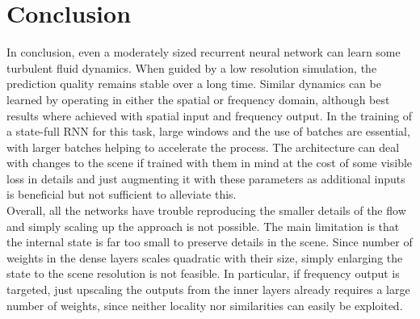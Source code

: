 \documentclass[sigconf]{acmart}
\begin{document}
\section{Conclusion}
In conclusion, even a moderately sized recurrent neural network can learn some turbulent fluid dynamics. When guided by a low resolution simulation, the prediction quality remains stable over a long time.
Similar dynamics can be learned by operating in either the spatial or frequency domain, although best results where achieved with spatial input and frequency output.
In the training of a state-full RNN for this task, large windows and the use of batches are essential, with larger batches helping to accelerate the process.
The architecture can deal with changes to the scene if trained with them in mind at the cost of some visible loss in details and just augmenting it with these parameters as additional inputs is beneficial but not sufficient to alleviate this. \\
Overall, all the networks have trouble reproducing the smaller details of the flow and simply scaling up the approach is not possible.
The main limitation is that the internal state is far too small to preserve details in the scene. Since number of weights in the dense layers scales quadratic with their size, simply enlarging the state to the scene resolution is not feasible.
In particular, if frequency output is targeted, just upscaling the outputs from the inner layers already requires a large number of weights, since neither locality nor similarities can easily be exploited.
\end{document}
